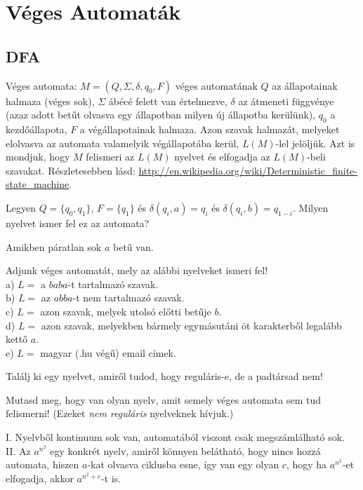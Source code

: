 \chapter{V\'eges Automat\'ak}

\section{DFA}

 Véges automata: $M=(Q,\Sigma,\delta,q_0,F)$ véges automatának $Q$ az állapotainak halmaza (véges sok), $\Sigma$ ábécé felett van értelmezve, $\delta$ az átmeneti függvénye (azaz adott betűt olvasva egy állapotban milyen új állapotba kerülünk), $q_0$ a kezdőállapota, $F$ a végállapotainak halmaza. Azon szavak halmazát, melyeket elolvasva az automata valamelyik végállapotába kerül, $L(M)$-lel jelöljük. Azt is mondjuk, hogy $M$ felismeri az $L(M)$ nyelvet \'es elfogadja az $L(M)$-beli szavakat.
R\'eszletesebben l\'asd: \url{http://en.wikipedia.org/wiki/Deterministic_finite-state_machine}. 

\begin{Exercise}[counter={sorszam}, difficulty=0]
	Legyen $Q=\{q_0,q_1\}$, $F=\{q_1\}$ és $\delta(q_i,a)=q_i$ és $\delta(q_i,b)=q_{1-i}$. Milyen nyelvet ismer fel ez az automata?
\end{Exercise}
\begin{Answer}
	Amikben p\'aratlan sok $a$ bet\H u van.
\end{Answer}

\begin{Exercise}[counter={sorszam}, difficulty=0]
	Adjunk véges automatát, mely az alábbi nyelveket ismeri fel!\\
a) $L=$ a $baba$-t tartalmazó szavak.\\
b) $L=$ az $abba$-t nem tartalmazó szavak.\\
c) $L=$ azon szavak, melyek utolsó előtti betűje $b$.\\
d) $L=$ azon szavak, melyekben bármely egymásutáni öt karakterből legalább kettő $a$.\\
e) $L=$ magyar (.hu v\'eg\H u) email c\'imek.
\end{Exercise}


\begin{Exercise}[counter={sorszam}, difficulty=0]
	 Tal\'alj ki egy nyelvet, amir\H ol tudod, hogy regul\'aris-e, de a padt\'arsad nem!
\end{Exercise}


\begin{Exercise}[counter={sorszam}, difficulty=0]
	 Mutasd meg, hogy van olyan nyelv, amit semely véges automata sem tud felismerni! (Ezeket {\em nem reguláris} nyelveknek hívjuk.)
\end{Exercise}	 
\begin{Answer}
	I. Nyelvb\H ol kontinuum sok van, automat\'ab\'ol viszont csak megsz\'aml\'alhat\'o sok.\\
	II. Az $a^{n^2}$ egy konkr\'et nyelv, amir\H ol k\"onnyen bel\'athat\'o, hogy nincs hozz\'a automata, hiszen $a$-kat olvasva ciklusba esne, \'igy van egy olyan $c$, hogy ha $a^{n^2}$-et elfogadja, akkor $a^{n^2+c}$-t is.
\end{Answer}


